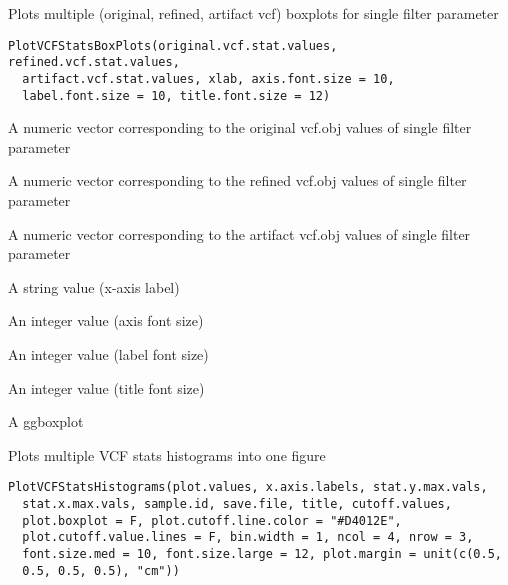 \documentclass[letterpaper]{book}
\begin{document}
%
\begin{Description}\relax
Plots multiple (original, refined, artifact vcf) boxplots for single filter parameter
\end{Description}
%
\begin{Usage}
\begin{verbatim}
PlotVCFStatsBoxPlots(original.vcf.stat.values, refined.vcf.stat.values,
  artifact.vcf.stat.values, xlab, axis.font.size = 10,
  label.font.size = 10, title.font.size = 12)
\end{verbatim}
\end{Usage}
%
\begin{Arguments}
\begin{ldescription}
\item[\code{original.vcf.stat.values}] A numeric vector corresponding to the original vcf.obj values of single filter parameter

\item[\code{refined.vcf.stat.values}] A numeric vector corresponding to the refined vcf.obj values of single filter parameter

\item[\code{artifact.vcf.stat.values}] A numeric vector corresponding to the artifact vcf.obj values of single filter parameter

\item[\code{xlab}] A string value (x-axis label)

\item[\code{axis.font.size}] An integer value (axis font size)

\item[\code{label.font.size}] An integer value (label font size)

\item[\code{title.font.size}] An integer value (title font size)
\end{ldescription}
\end{Arguments}
%
\begin{Value}
A ggboxplot
\end{Value}
%
\begin{Description}\relax
Plots multiple VCF stats histograms into one figure
\end{Description}
%
\begin{Usage}
\begin{verbatim}
PlotVCFStatsHistograms(plot.values, x.axis.labels, stat.y.max.vals,
  stat.x.max.vals, sample.id, save.file, title, cutoff.values,
  plot.boxplot = F, plot.cutoff.line.color = "#D4012E",
  plot.cutoff.value.lines = F, bin.width = 1, ncol = 4, nrow = 3,
  font.size.med = 10, font.size.large = 12, plot.margin = unit(c(0.5,
  0.5, 0.5, 0.5), "cm"))
\end{verbatim}
\end{Usage}
\end{document}

